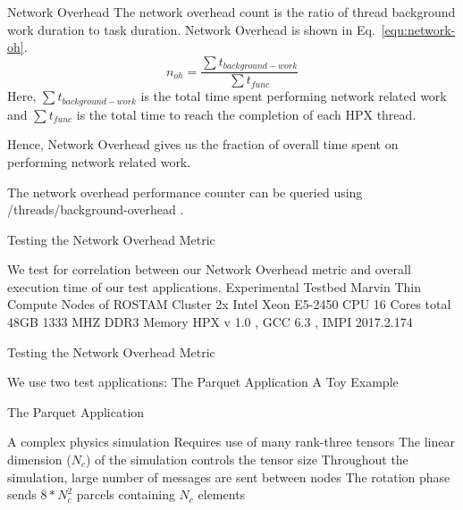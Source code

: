 \documentclass[10pt]{beamer}
\begin{document}
\begin{frame}{Network Overhead}
The network overhead count is the ratio of 
thread background work duration to task duration.
Network Overhead is shown in Eq.~\ref{equ:network-oh}.
%
\begin{equation}
n_{oh} = \frac{\sum{t_{{background-work}}}}{\sum{t_{{func}}}}
\label{equ:network-oh}
\end{equation}
%
Here, $\sum{t_{{background-work}}}$ is the total time spent performing network related work and $\sum{t_{{func}}}$ is the total time to reach the completion of each HPX thread.

Hence, Network Overhead gives us the fraction of overall time spent on performing network related work.

The network overhead performance counter can be queried using \alert{/threads/background-overhead} . 
\end{frame}

\begin{frame}{Testing the Network Overhead Metric}
\begin{outline}
	\1 We test for correlation between our Network Overhead metric and overall execution time of our test applications.
	\1 Experimental Testbed 
		\2 Marvin Thin Compute Nodes of ROSTAM Cluster 
		\2 2x Intel Xeon E5-2450 CPU 16 Cores total 
		\2 48GB 1333 MHZ DDR3 Memory 
		\2 HPX v 1.0 , GCC 6.3 , IMPI 2017.2.174
	
\end{outline}
\end{frame}

\begin{frame}{Testing the Network Overhead Metric}
\begin{outline}
	\1 We use two test applications:
		\2 The Parquet Application
		\2 A Toy Example
\end{outline}
\end{frame}

\begin{frame}{The Parquet Application}
\begin{outline}
		\1 A complex physics simulation
		\1 Requires use of many rank-three tensors
		\1 The linear dimension ($N_c$)  of the simulation controls the tensor size
		\1 Throughout the simulation, large number of messages are sent between nodes
		\1 The \alert{rotation phase }sends $8*N_c^2$ parcels containing $N_c$ elements

\end{outline}
\end{frame}
\end{document}
